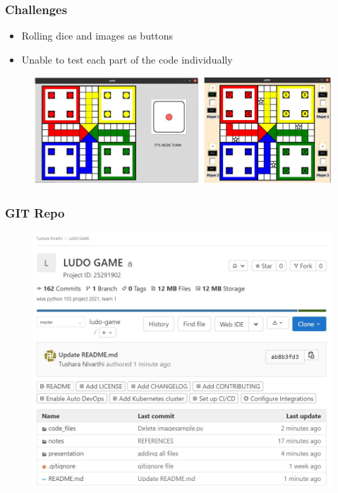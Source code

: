 \documentclass[15pt]{beamer}
\begin{document}
\begin{frame}
\begin {itemize}
	    \end{itemize}
    \end{frame}

    \begin{frame}
	    \frametitle{Challenges}
	    \begin{itemize}
	      
              \item Rolling dice and images as buttons
	      \item Unable to test each part of the code individually
		\end{itemize}

		      \begin{figure}
		      \includegraphics[width=1\linewidth]{dice.jpeg}
                          
		      \end{figure}
		
    \end{frame}

    
	
        


    \begin{frame}
    \frametitle{GIT Repo}
    \begin{figure}
	    \includegraphics[width=0.9\linewidth]{git_final_repo.jpg}
	    
    \end{figure}
    \end{frame}
\end{document}
